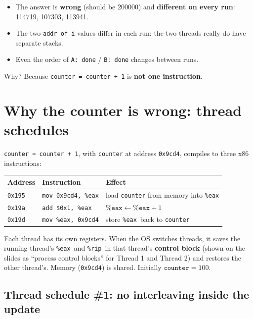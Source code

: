 \documentclass[11pt,a4paper]{article}
\newcommand{\eax}{\texttt{\%eax}}
\newcommand{\rip}{\texttt{\%rip}}
\begin{document}
\begin{warnbox}[Observations]
\begin{itemize}
  \item The answer is \textbf{wrong} (should be 200000) and
        \textbf{different on every run}: 114719, 107303, 113941.
  \item The two \texttt{addr of i} values differ in each run: the two
        threads really do have separate stacks.
  \item Even the order of \texttt{A: done} / \texttt{B: done} changes between
        runs.
\end{itemize}
Why? Because \texttt{counter = counter + 1} is \textbf{not one
instruction}.
\end{warnbox}

\section{Why the counter is wrong: thread schedules}

\texttt{counter = counter + 1}, with \texttt{counter} at address
\texttt{0x9cd4}, compiles to three x86 instructions:

\begin{center}
\renewcommand{\arraystretch}{1.12}
\begin{tabular}{@{}lll@{}}
  \toprule
  \textbf{Address} & \textbf{Instruction} & \textbf{Effect} \\
  \midrule
  \texttt{0x195} & \texttt{mov 0x9cd4, \%eax} & load \texttt{counter} from memory into \eax \\
  \texttt{0x19a} & \texttt{add \$0x1, \%eax}  & \(\eax \gets \eax + 1\) \\
  \texttt{0x19d} & \texttt{mov \%eax, 0x9cd4} & store \eax\ back to \texttt{counter} \\
  \bottomrule
\end{tabular}
\end{center}

Each thread has its own registers. When the OS switches threads, it saves
the running thread's \eax\ and \rip\ in that thread's \textbf{control
block} (shown on the slides as ``process control blocks'' for Thread 1 and
Thread 2) and restores the other thread's. Memory (\texttt{0x9cd4}) is
shared. Initially \(\texttt{counter} = 100\).

\subsection{Thread schedule \#1: no interleaving inside the update}
\end{document}
